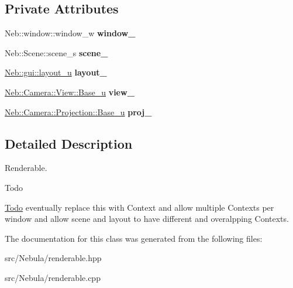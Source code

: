 \subsection*{\-Private \-Attributes}
\begin{DoxyCompactItemize}
\item 
\hypertarget{classNeb_1_1renderable_a4f8954124931d93eddf660c98a45cf7d}{\-Neb\-::window\-::window\-\_\-w {\bfseries window\-\_\-}}\label{classNeb_1_1renderable_a4f8954124931d93eddf660c98a45cf7d}

\item 
\hypertarget{classNeb_1_1renderable_a56c97489c92bfa73d8a131efd1c1958d}{\-Neb\-::\-Scene\-::scene\-\_\-s {\bfseries scene\-\_\-}}\label{classNeb_1_1renderable_a56c97489c92bfa73d8a131efd1c1958d}

\item 
\hypertarget{classNeb_1_1renderable_a5e90c1aba3bb47b0071bd79a00975b49}{\hyperlink{classNeb_1_1unique__ptr}{\-Neb\-::gui\-::layout\-\_\-u} {\bfseries layout\-\_\-}}\label{classNeb_1_1renderable_a5e90c1aba3bb47b0071bd79a00975b49}

\item 
\hypertarget{classNeb_1_1renderable_a6585f1507f5afeb152b50fa2a103697a}{\hyperlink{classNeb_1_1unique__ptr}{\-Neb\-::\-Camera\-::\-View\-::\-Base\-\_\-u} {\bfseries view\-\_\-}}\label{classNeb_1_1renderable_a6585f1507f5afeb152b50fa2a103697a}

\item 
\hypertarget{classNeb_1_1renderable_a3178d18be5e839c357afefb42e85f788}{\hyperlink{classNeb_1_1unique__ptr}{\-Neb\-::\-Camera\-::\-Projection\-::\-Base\-\_\-u} {\bfseries proj\-\_\-}}\label{classNeb_1_1renderable_a3178d18be5e839c357afefb42e85f788}

\end{DoxyCompactItemize}


\subsection{\-Detailed \-Description}
\-Renderable. 

\begin{DoxyRefDesc}{\-Todo}
\item[\hyperlink{todo__todo000012}{\-Todo}]eventually replace this with \-Context and allow multiple \-Contexts per window and allow scene and layout to have different and overalpping \-Contexts. \end{DoxyRefDesc}


\-The documentation for this class was generated from the following files\-:\begin{DoxyCompactItemize}
\item 
src/\-Nebula/renderable.\-hpp\item 
src/\-Nebula/renderable.\-cpp\end{DoxyCompactItemize}

